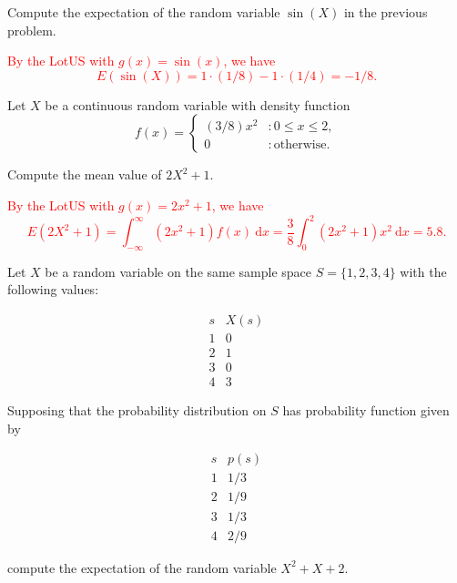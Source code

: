 \documentclass[12pt,reqno]{amsart}
\begin{document}
\bigskip
\prob Compute the expectation of the random variable $\sin(X)$ in the previous problem.

\bigskip
\textcolor{red}{By the LotUS with $g(x) = \sin(x)$, we have
	\[
	E(\sin(X)) = 1 \cdot( 1/8) -1 \cdot (1/4) = -1/8.
	\]}











\bigskip
\prob Let $X$ be a continuous random variable with density function
	\[
	f(x) = \begin{cases}
	(3/8)x^2 & : 0 \leq x \leq 2, \\
	0 & : \text{otherwise}.
	\end{cases}
	\]

Compute the mean value of $2X^2+1$.

\bigskip
\textcolor{red}{By the LotUS with $g(x) = 2x^2+1$, we have
	\[
	E(2X^2+1) = \int_{-\infty}^\infty(2x^2+1)f(x) \ \text{d} x = \frac{3}{8} \int_0^2 (2x^2+1)x^2 \ \text{d} x = 5.8.
	\]}













\bigskip
\prob Let $X$ be a random variable on the same sample space $S = \{1,2,3,4\}$ with the following values:

	\[
	\begin{array}{c|c}
	s & X(s)  \\ \hline
	1 & 0  \\
	2 & 1  \\
	3 & 0 \\
	4 & 3
	\end{array}
	\]

Supposing that the probability distribution on $S$ has probability function given by

	\[
	\begin{array}{c|c}
	s & p(s)  \\ \hline
	1 & 1/3  \\
	2 & 1/9  \\
	3 & 1/3 \\
	4 & 2/9
	\end{array}
	\]

compute the expectation of the random variable $X^2 + X + 2$.
\end{document}

